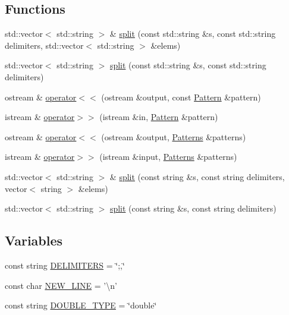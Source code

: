 \subsection*{Functions}
\begin{DoxyCompactItemize}
\item 
std\+::vector$<$ std\+::string $>$ \& \hyperlink{namespaceopf_a4139dd0ca5d806a57070e456c0d18361}{split} (const std\+::string \&s, const std\+::string delimiters, std\+::vector$<$ std\+::string $>$ \&elems)
\item 
std\+::vector$<$ std\+::string $>$ \hyperlink{namespaceopf_af2ed926a647540b440c4e4862900d490}{split} (const std\+::string \&s, const std\+::string delimiters)
\item 
ostream \& \hyperlink{namespaceopf_acf5fd15fc266cd630fe92b43dcdf8d21}{operator$<$$<$} (ostream \&output, const \hyperlink{classopf_1_1Pattern}{Pattern} \&pattern)
\item 
istream \& \hyperlink{namespaceopf_a982afea1c95e9fb04a185a92c32365ac}{operator$>$$>$} (istream \&in, \hyperlink{classopf_1_1Pattern}{Pattern} \&pattern)
\item 
ostream \& \hyperlink{namespaceopf_a45f91c273b7cc06225afea23e5a9f57a}{operator$<$$<$} (ostream \&output, \hyperlink{classopf_1_1Patterns}{Patterns} \&patterns)
\item 
istream \& \hyperlink{namespaceopf_a9110e212f5421faed711b796e70154ae}{operator$>$$>$} (istream \&input, \hyperlink{classopf_1_1Patterns}{Patterns} \&patterns)
\item 
std\+::vector$<$ std\+::string $>$ \& \hyperlink{namespaceopf_ac0a9328d1aefac557ab4b80d93e32612}{split} (const string \&s, const string delimiters, vector$<$ string $>$ \&elems)
\item 
std\+::vector$<$ std\+::string $>$ \hyperlink{namespaceopf_a58ed4284e9e25486ac72fd2b486106e8}{split} (const string \&s, const string delimiters)
\end{DoxyCompactItemize}
\subsection*{Variables}
\begin{DoxyCompactItemize}
\item 
const string \hyperlink{namespaceopf_ae15591d0357a37e20eb0fefe5788dfd8}{D\+E\+L\+I\+M\+I\+T\+E\+R\+S} = \char`\"{};,\char`\"{}
\item 
const char \hyperlink{namespaceopf_a2b1f54bbedca5f63be8b631958338bb3}{N\+E\+W\+\_\+\+L\+I\+N\+E} = '\textbackslash{}n'
\item 
const string \hyperlink{namespaceopf_ae9f8261bcfab62d67f9532d544265859}{D\+O\+U\+B\+L\+E\+\_\+\+T\+Y\+P\+E} = \char`\"{}double\char`\"{}
\end{DoxyCompactItemize}


